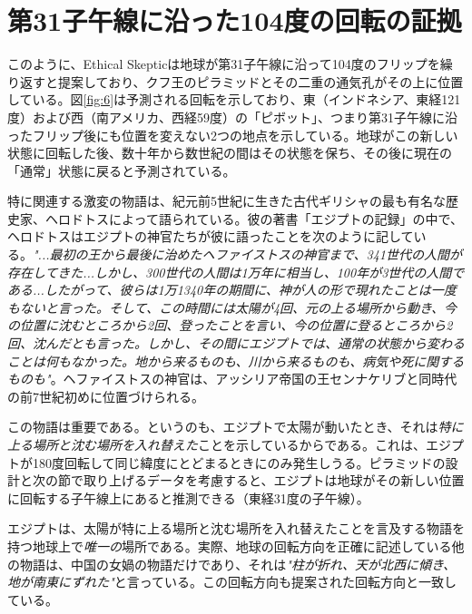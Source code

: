 \documentclass[10pt,twocolumn,letterpaper]{article}
\begin{document}
\section{第31子午線に沿った104度の回転の証拠}

このように、Ethical Skepticは地球が第31子午線に沿って104度のフリップを繰り返すと提案しており、クフ王のピラミッドとその二重の通気孔がその上に位置している。図\ref{fig:6}は予測される回転を示しており、東（インドネシア、東経121度）および西（南アメリカ、西経59度）の「ピボット」、つまり第31子午線に沿ったフリップ後にも位置を変えない2つの地点を示している。地球がこの新しい状態に回転した後、数十年から数世紀の間はその状態を保ち、その後に現在の「通常」状態に戻ると予測されている\cite{150}。

特に関連する激変の物語は、紀元前5世紀に生きた古代ギリシャの最も有名な歴史家、ヘロドトスによって語られている\cite{31}。彼の著書「エジプトの記録」の中で、ヘロドトスはエジプトの神官たちが彼に語ったことを次のように記している。\textit{"...最初の王から最後に治めたヘファイストスの神官まで、341世代の人間が存在してきた...しかし、300世代の人間は1万年に相当し、100年が3世代の人間である...したがって、彼らは1万1340年の期間に、神が人の形で現れたことは一度もないと言った。そして、この時間には太陽が4回、元の上る場所から動き、今の位置に沈むところから2回、登ったことを言い、今の位置に登るところから2回、沈んだとも言った。しかし、その間にエジプトでは、通常の状態から変わることは何もなかった。地から来るものも、川から来るものも、病気や死に関するものも"}\cite{32}。ヘファイストスの神官は、アッシリア帝国の王センナケリブと同時代の前7世紀初めに位置づけられる\cite{32,33,34}。

この物語は重要である。というのも、エジプトで太陽が動いたとき、それは\textit{特に上る場所と沈む場所を入れ替えた}ことを示しているからである。これは、エジプトが180度回転して同じ緯度にとどまるときにのみ発生しうる。ピラミッドの設計と次の節で取り上げるデータを考慮すると、エジプトは地球がその新しい位置に回転する子午線上にあると推測できる（東経31度の子午線）。

エジプトは、太陽が特に上る場所と沈む場所を入れ替えたことを言及する物語を持つ地球上で\textit{唯一の}場所である。実際、地球の回転方向を正確に記述している他の物語は、中国の女媧の物語だけであり、それは\textit{"柱が折れ、天が北西に傾き、地が南東にずれた"}と言っている\cite{8}。この回転方向も提案された回転方向と一致している。
\end{document}
